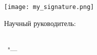 \begin{minipage}[b]{0.43\linewidth}
    \begin{flushleft}
      \texttt{[image: my\_signature.png]}
    \end{flushleft}
  \end{minipage}%
  \begin{minipage}[b]{0.5\linewidth}
    \begin{flushright}
      Научный руководитель:\\
      \supervisorRegaliaShort \\
      \supervisorFio
    \end{flushright}
  \end{minipage}








%
\vspace{0pt plus4fill} %
{\centering\thesisCity\ "--- \thesisYear\par}
